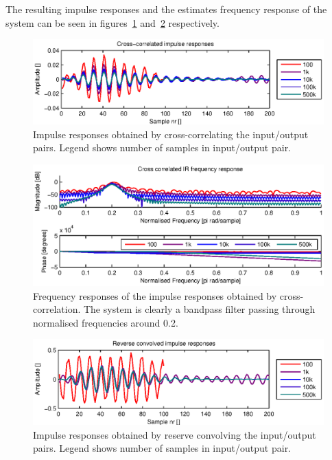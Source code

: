 The resulting impulse responses and the estimates frequency response of the system can be seen in figures~\ref{fig:xcorr_IR} and~\ref{fig:xcorr_freqz} respectively.

\begin{figure}
	\center
	\includegraphics{./picture/xcorr_IR.eps}
	\caption{Impulse responses obtained by cross-correlating the input/output pairs. Legend shows number of samples in
	input/output pair.}
	\label{fig:xcorr_IR}
\end{figure}

\begin{figure}
	\center
	\includegraphics{./picture/xcorr_responses.eps}
	\caption{Frequency responses of the impulse responses obtained by cross-correlation. The system is clearly a bandpass filter 
	passing through normalised frequencies around 0.2.}
	\label{fig:xcorr_freqz}
\end{figure}

\begin{figure}
	\center
	\includegraphics{./picture/rconv_IR.eps}
	\caption{Impulse responses obtained by reserve convolving the input/output pairs. Legend shows number of samples in input/output pair.}
	\label{fig:rconv_IR}
\end{figure}

